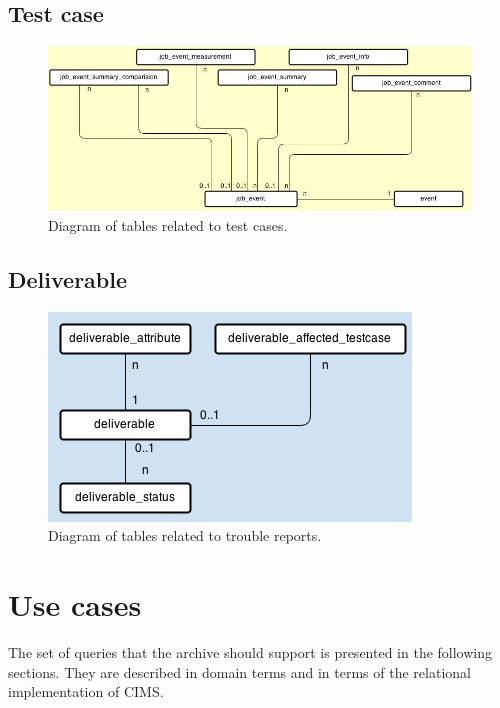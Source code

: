 \subsection{Test case}
\begin{figure}[h!]
\centering
\includegraphics[scale=0.5]{figure/job_event.jpg}
\caption{Diagram of tables related to test cases.}
\label{fig:job_event}
\end{figure}

\subsection{Deliverable}
\begin{figure}[h!]
\centering
\includegraphics[scale=0.5]{figure/deliverable.jpg}
\caption{Diagram of tables related to trouble reports.}
\label{fig:deliverable}
\end{figure}


\section{Use cases}
\label{sec:usecases}
The set of queries that the archive should support is presented in the following sections. They are described in domain terms and in terms of the relational implementation of CIMS.


